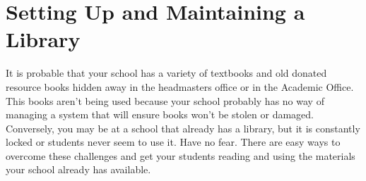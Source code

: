 \chapter{Setting Up and Maintaining a Library}
It is probable that your school has a variety of textbooks and old donated resource books hidden away in the headmasters office or in the Academic Office.  This books aren't being used because your school probably has no way of managing a system that will ensure books won't be stolen or damaged. \\

Conversely, you may be at a school that already has a library, but it is constantly locked or students never seem to use it.  Have no fear.  There are easy ways to overcome these challenges and get your students reading and using the materials your school already has available. \\
\begin{center}
\setlength\fboxsep{0pt}
\setlength\fboxrule{2pt}
\end{center}

